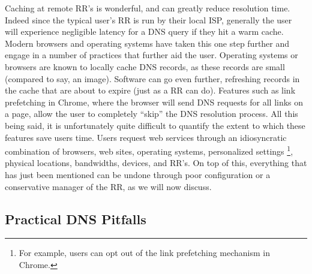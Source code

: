\documentclass[sigconf,nonacm,10pt]{acmart}
\begin{document}
Caching at remote RR's is wonderful, and can greatly reduce resolution
time. Indeed since the typical user's RR is run by their local ISP,
generally the user will experience negligible latency for a DNS query if
they hit a warm cache. Modern browsers and operating systems have taken
this one step further and engage in a number of practices that further
aid the user. Operating systems or browsers are known to locally cache
DNS records, as these records are small (compared to say, an image).
Software can go even further, refreshing records in the cache that are
about to expire (just as a RR can do). Features such as link prefetching
in Chrome, where the browser will send DNS requests for all links on a
page, allow the user to completely ``skip'' the DNS resolution process.
All this being said, it is unfortunately quite difficult to quantify the
extent to which these features save users time. Users request web
services through an idiosyncratic combination of browsers, web sites,
operating systems, personalized settings
\footnote{ For example, users can opt out of the link prefetching mechanism in Chrome. },
physical locations, bandwidths, devices, and RR's. On top of this,
everything that has just been mentioned can be undone through poor
configuration or a conservative manager of the RR, as we will now
discuss.

\subsection{Practical DNS Pitfalls}\label{practical-dns-pitfalls-1}
\end{document}
